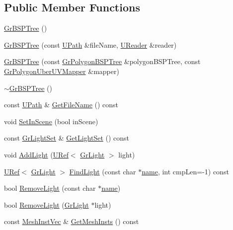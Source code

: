 \subsection*{Public Member Functions}
\begin{CompactItemize}
\item 
\hyperlink{class_gr_b_s_p_tree_74ddd5b1e416fcf6afe52d705c19af77}{GrBSPTree} ()
\item 
\hyperlink{class_gr_b_s_p_tree_457ee72d9c2b4d6ea5db3008bd06b5c6}{GrBSPTree} (const \hyperlink{class_u_path}{UPath} \&fileName, \hyperlink{class_u_reader}{UReader} \&reader)
\item 
\hyperlink{class_gr_b_s_p_tree_ec54138b350c38053b2e1020afa25731}{GrBSPTree} (const \hyperlink{class_gr_polygon_b_s_p_tree}{GrPolygonBSPTree} \&polygonBSPTree, const \hyperlink{class_gr_polygon_uber_u_v_mapper}{GrPolygonUberUVMapper} \&mapper)
\item 
\hyperlink{class_gr_b_s_p_tree_c3e9b4ebbae5f0abe4b0a9e01e030e27}{$\sim$GrBSPTree} ()
\item 
const \hyperlink{class_u_path}{UPath} \& \hyperlink{class_gr_b_s_p_tree_1e39974a60cdd4e087f2581a03300e18}{GetFileName} () const 
\item 
void \hyperlink{class_gr_b_s_p_tree_e6c5ef163373e38cf35a23177974dc66}{SetInScene} (bool inScene)
\item 
const \hyperlink{class_gr_light_set}{GrLightSet} \& \hyperlink{class_gr_b_s_p_tree_439816bd7db6f8c5d4998964d1d277f0}{GetLightSet} () const 
\item 
void \hyperlink{class_gr_b_s_p_tree_b5b7d54243589001d2113518468109ba}{AddLight} (\hyperlink{class_u_ref}{URef}$<$ \hyperlink{class_gr_light}{GrLight} $>$ light)
\item 
\hyperlink{class_u_ref}{URef}$<$ \hyperlink{class_gr_light}{GrLight} $>$ \hyperlink{class_gr_b_s_p_tree_f2ace173c279ad61db04e13ed279d815}{FindLight} (const char $\ast$\hyperlink{glext__bak_8h_bb62efe59ccdd153ce42e1a418352209}{name}, int cmpLen=-1) const 
\item 
bool \hyperlink{class_gr_b_s_p_tree_67eec7c3976ce36c454accf2e3c9ad20}{RemoveLight} (const char $\ast$\hyperlink{glext__bak_8h_bb62efe59ccdd153ce42e1a418352209}{name})
\item 
bool \hyperlink{class_gr_b_s_p_tree_945f67a8ea6830ad1622880a48d3753a}{RemoveLight} (\hyperlink{class_gr_light}{GrLight} $\ast$light)
\item 
const \hyperlink{class_gr_b_s_p_tree_17eda1992ed024630ab8ae114f7c78a3}{MeshInstVec} \& \hyperlink{class_gr_b_s_p_tree_018210325b71cd73cb2ae8891d037f9a}{GetMeshInsts} () const 

\end{CompactItemize}
